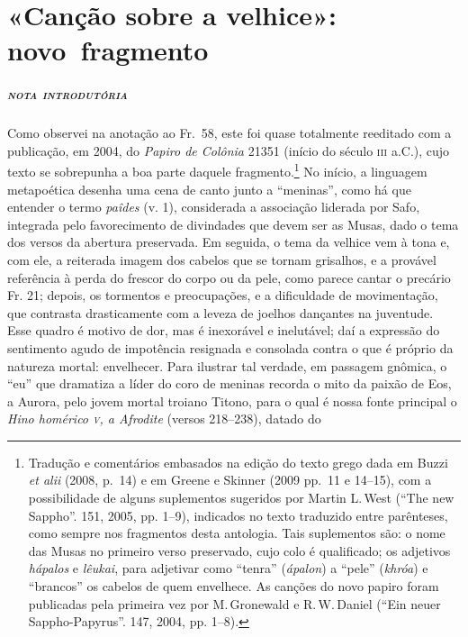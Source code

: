 {\chapter{«Canção sobre a velhice»: novo~fragmento}

\paragraph{\textsc{nota introdutória}}
Como observei na anotação ao Fr.~58, este foi quase totalmente reeditado com a 
publicação, em 2004, do \textit{Papiro de Colônia} 21351 (início do século \textsc{iii} a.C.), 
cujo texto se sobrepunha a boa parte daquele fragmento.\footnote{Tradução e comentários embasados na edição do texto grego dada em Buzzi \textit{et alii} (2008, p.~14) e em Greene e Skinner (2009 pp.~11 e 14--15), com a possibilidade de alguns suplementos sugeridos por Martin L.\,West (``The new Sappho''. \textit{} 151, 2005, pp. 1--9), indicados no texto traduzido entre parênteses, como sempre nos fragmentos desta antologia. Tais suplementos são: o nome das Musas no primeiro verso preservado, cujo colo é qualificado; os adjetivos \textit{hápalos} e \textit{lêukai}, para adjetivar como ``tenra'' (\textit{ápalon}) a ``pele'' (\textit{khróa}) e ``brancos'' os cabelos de quem envelhece. As canções do novo papiro foram publicadas pela primeira vez por M.\,Gronewald e R.\,W.\,Daniel (``Ein neuer Sappho-Papyrus''. \textit{} 147, 2004, pp. 1--8).} No início, a 
linguagem metapoética desenha uma cena de canto junto a ``meninas'', como há que entender o termo \textit{paîdes} (v. 1), considerada a associação liderada por Safo, 
integrada pelo favorecimento de divindades que devem ser as Musas,
dado o tema dos versos da abertura preservada. Em seguida, o tema da velhice
vem à tona e, com ele, a reiterada imagem dos cabelos que se tornam grisalhos,
e a provável referência à perda do frescor do corpo ou da pele, como parece cantar o precário Fr. 21; depois, os
tormentos e preocupações, e a dificuldade de movimentação, que contrasta
drasticamente com a leveza de joelhos dançantes na juventude. Esse quadro é
motivo de dor, mas é inexorável e inelutável; daí a expressão do sentimento
agudo de impotência resignada e consolada contra o que é próprio da natureza mortal: envelhecer. Para
ilustrar tal verdade, em passagem gnômica, o “eu” que dramatiza a líder do coro de meninas recorda o
mito da paixão de Eos, a Aurora, pelo jovem mortal troiano Titono, para o qual é nossa fonte
principal o \textit{Hino homérico \textsc{v}, a Afrodite }(versos 218--238), datado do
}

